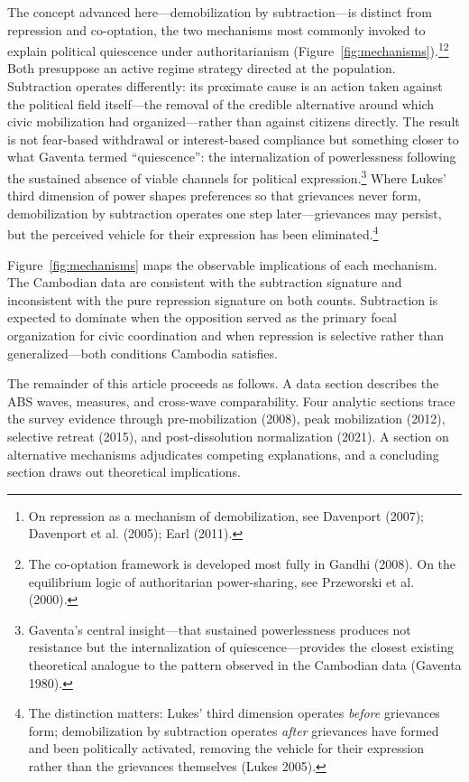 \documentclass[Review,times,sageh,doublespace]{sagej}
\begin{document}
The concept advanced here---demobilization by subtraction---is distinct
from repression and co-optation, the two mechanisms most commonly
invoked to explain political quiescence under authoritarianism
(Figure~\ref{fig:mechanisms}).\footnote{On repression as a mechanism of
  demobilization, see Davenport (2007); Davenport et al. (2005); Earl
  (2011).}\footnote{The co-optation framework is developed most fully in
  Gandhi (2008). On the equilibrium logic of authoritarian
  power-sharing, see Przeworski et al. (2000).} Both presuppose an
active regime strategy directed at the population. Subtraction operates
differently: its proximate cause is an action taken against the
political field itself---the removal of the credible alternative around
which civic mobilization had organized---rather than against citizens
directly. The result is not fear-based withdrawal or interest-based
compliance but something closer to what Gaventa termed ``quiescence'':
the internalization of powerlessness following the sustained absence of
viable channels for political expression.\footnote{Gaventa's central
  insight---that sustained powerlessness produces not resistance but the
  internalization of quiescence---provides the closest existing
  theoretical analogue to the pattern observed in the Cambodian data
  (Gaventa 1980).} Where Lukes' third dimension of power shapes
preferences so that grievances never form, demobilization by subtraction
operates one step later---grievances may persist, but the perceived
vehicle for their expression has been eliminated.\footnote{The
  distinction matters: Lukes' third dimension operates \emph{before}
  grievances form; demobilization by subtraction operates \emph{after}
  grievances have formed and been politically activated, removing the
  vehicle for their expression rather than the grievances themselves
  (Lukes 2005).}

Figure~\ref{fig:mechanisms} maps the observable implications of each
mechanism. The Cambodian data are consistent with the subtraction
signature and inconsistent with the pure repression signature on both
counts. Subtraction is expected to dominate when the opposition served
as the primary focal organization for civic coordination and when
repression is selective rather than generalized---both conditions
Cambodia satisfies.

The remainder of this article proceeds as follows. A data section
describes the ABS waves, measures, and cross-wave comparability. Four
analytic sections trace the survey evidence through pre-mobilization
(2008), peak mobilization (2012), selective retreat (2015), and
post-dissolution normalization (2021). A section on alternative
mechanisms adjudicates competing explanations, and a concluding section
draws out theoretical implications.
\end{document}
